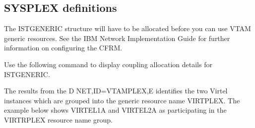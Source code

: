 \documentclass[letterpaper,10pt,english]{sphinxmanual}
\begin{document}
\subsection{SYSPLEX definitions}
\label{\detokenize{connectivity_guide:sysplex-definitions}}\label{\detokenize{connectivity_guide:index-171}}
\sphinxAtStartPar
The ISTGENERIC structure will have to be allocated before you can use VTAM generic resources. See the IBM Network Implementation Guide for further information on configuring the CFRM.

\sphinxAtStartPar
Use the following command to display coupling allocation details for ISTGENERIC.

\begin{sphinxVerbatim}[commandchars=\\\{\}]
 
\end{sphinxVerbatim}

\sphinxAtStartPar
{}

\sphinxAtStartPar
The results from the D NET,ID=VTAMPLEX,E identifies the two Virtel instances which are grouped into the generic resource name VIRTPLEX. The example below shows VIRTEL1A and VIRTEL2A as participating in the VIRTRPLEX resource name group.

\begin{sphinxVerbatim}[commandchars=\\\{\}]
 

  
        
      
    
    
      
         
      
 
\end{sphinxVerbatim}
\end{document}
